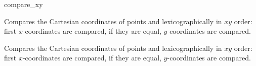 \begin{ccRefFunction}{compare_xy}

      {Compares the Cartesian coordinates of points  and
        lexicographically in $xy$ order: first 
       $x$-coordinates are compared, if they are equal, $y$-coordinates
       are compared.}

      {Compares the Cartesian coordinates of points  and
        lexicographically in $xy$ order: first 
       $x$-coordinates are compared, if they are equal, $y$-coordinates
       are compared.}

\ccSeeAlso
{} \\
 \\
 \\
 \\
 \\
 \\
 \\

\end{ccRefFunction}

